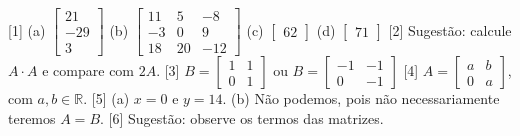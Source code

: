 \documentclass[12pt,a4paper]{article}
\begin{document}
[1] 
(a) $\begin{bmatrix}21 \\ -29 \\ 3\end{bmatrix}$ 
(b) $\begin{bmatrix}11 & 5 & -8 \\ -3 & 0 & 9 \\ 18 & 20 & -12\end{bmatrix}$ 
(c) $\begin{bmatrix} 62 \end{bmatrix}$ 
(d) $\begin{bmatrix} 71 \end{bmatrix}$ 
[2] Sugestão: calcule $A\cdot A$ e compare com $2A$. 
[3] $B = \begin{bmatrix}1 & 1 \\ 0 & 1\end{bmatrix}$ ou $B = \begin{bmatrix}-1 & -1 \\ 0 & -1\end{bmatrix}$ 
[4] $A = \begin{bmatrix}a & b \\ 0 & a\end{bmatrix}$, com $a, b\in\mathbb{R}$. 
[5]
(a) $x = 0$ e $y = 14$. 
(b) Não podemos, pois não necessariamente teremos $A = B$.
[6] Sugestão: observe os termos das matrizes.
\end{document}
